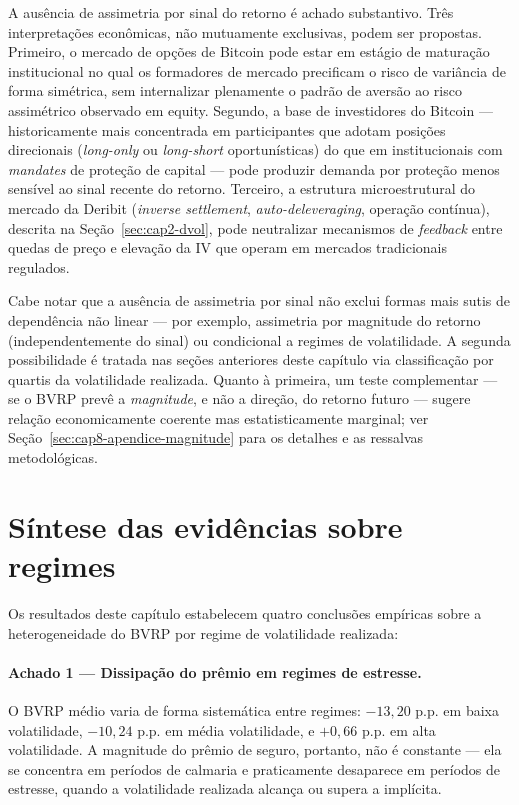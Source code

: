 A ausência de assimetria por sinal do retorno é achado substantivo. Três interpretações econômicas, não mutuamente exclusivas, podem ser propostas. Primeiro, o mercado de opções de Bitcoin pode estar em estágio de maturação institucional no qual os formadores de mercado precificam o risco de variância de forma simétrica, sem internalizar plenamente o padrão de aversão ao risco assimétrico observado em equity. Segundo, a base de investidores do Bitcoin --- historicamente mais concentrada em participantes que adotam posições direcionais (\textit{long-only} ou \textit{long-short} oportunísticas) do que em institucionais com \textit{mandates} de proteção de capital --- pode produzir demanda por proteção menos sensível ao sinal recente do retorno. Terceiro, a estrutura microestrutural do mercado da Deribit (\textit{inverse settlement}, \textit{auto-deleveraging}, operação contínua), descrita na Seção~\ref{sec:cap2-dvol}, pode neutralizar mecanismos de \textit{feedback} entre quedas de preço e elevação da IV que operam em mercados tradicionais regulados.

Cabe notar que a ausência de assimetria por sinal não exclui formas mais sutis de dependência não linear --- por exemplo, assimetria por magnitude do retorno (independentemente do sinal) ou condicional a regimes de volatilidade. A segunda possibilidade é tratada nas seções anteriores deste capítulo via classificação por quartis da volatilidade realizada. Quanto à primeira, um teste complementar --- se o BVRP prevê a \emph{magnitude}, e não a direção, do retorno futuro --- sugere relação economicamente coerente mas estatisticamente marginal; ver Seção~\ref{sec:cap8-apendice-magnitude} para os detalhes e as ressalvas metodológicas.

\section{Síntese das evidências sobre regimes}
\label{sec:cap9_sintese}

Os resultados deste capítulo estabelecem quatro conclusões empíricas sobre a heterogeneidade do BVRP por regime de volatilidade realizada:

\paragraph{Achado 1 --- Dissipação do prêmio em regimes de estresse.} O BVRP médio varia de forma sistemática entre regimes: $-13{,}20$ p.p. em baixa volatilidade, $-10{,}24$ p.p. em média volatilidade, e $+0{,}66$ p.p. em alta volatilidade. A magnitude do prêmio de seguro, portanto, não é constante --- ela se concentra em períodos de calmaria e praticamente desaparece em períodos de estresse, quando a volatilidade realizada alcança ou supera a implícita.

